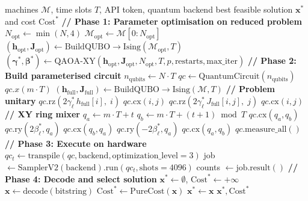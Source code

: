 \begin{algorithm}[htbp]
\small
\caption{QAOA Hardware Execution Pipeline}
\label{alg:qaoa_hardware}
\begin{algorithmic}[1]
\Require machines $\mathcal{M}$, time slots $T$, API token, quantum backend
\Ensure best feasible solution $\mathbf{x}^*$ and cost $\text{Cost}^*$
\Statex \textbf{// Phase 1: Parameter optimisation on reduced problem}
\State $N_{\text{opt}} \gets \min(N, 4)$
\State $\mathcal{M}_{\text{opt}} \gets \mathcal{M}[0 : N_{\text{opt}}]$
\State $(\mathbf{h}_{\text{opt}}, \mathbf{J}_{\text{opt}}) \gets \text{BuildQUBO} \rightarrow \text{Ising}(\mathcal{M}_{\text{opt}}, T)$
\State $(\boldsymbol{\gamma}^*, \boldsymbol{\beta}^*) \gets \text{QAOA-XY}(\mathbf{h}_{\text{opt}}, \mathbf{J}_{\text{opt}}, N_{\text{opt}}, T, p, \text{restarts}, \text{max\_iter})$
\Statex \textbf{// Phase 2: Build parameterised circuit}
\State $n_{\text{qubits}} \gets N \cdot T$
\State $qc \gets \text{QuantumCircuit}(n_{\text{qubits}})$
    \State $qc.x(m \cdot T)$
\EndFor
\State $(\mathbf{h}_{\text{full}}, \mathbf{J}_{\text{full}}) \gets \text{BuildQUBO} \rightarrow \text{Ising}(\mathcal{M}, T)$
    \Statex \textbf{// Problem unitary}
        \State $qc.\text{rz}(2 \gamma^*_\ell \, h_{\text{full}}[i],\; i)$
    \EndFor
        \State $qc.\text{cx}(i, j)$
        \State $qc.\text{rz}(2 \gamma^*_\ell \, J_{\text{full}}[i,j],\; j)$
        \State $qc.\text{cx}(i, j)$
    \EndFor
    \Statex \textbf{// XY ring mixer}
            \State $q_a \gets m \cdot T + t$
            \State $q_b \gets m \cdot T + (t+1) \bmod T$
            \State $qc.\text{cx}(q_a, q_b)$
            \State $qc.\text{ry}(2 \beta^*_\ell, q_a)$
            \State $qc.\text{cx}(q_b, q_a)$
            \State $qc.\text{ry}(-2 \beta^*_\ell, q_a)$
            \State $qc.\text{cx}(q_a, q_b)$
        \EndFor
    \EndFor
\EndFor
\State $qc.\text{measure\_all}()$
\Statex \textbf{// Phase 3: Execute on hardware}
\State $qc_t \gets \text{transpile}(qc, \text{backend}, \text{optimization\_level}=3)$
\State job $\gets \text{SamplerV2}(\text{backend}).\text{run}(qc_t, \text{shots}=4096)$
\State counts $\gets \text{job.result}()$
\Statex \textbf{// Phase 4: Decode and select solution}
\State $\mathbf{x}^* \gets \emptyset$, \quad $\text{Cost}^* \gets +\infty$
    \State $\mathbf{x} \gets \text{decode}(\text{bitstring})$
            \State $\text{Cost}^* \gets \text{PureCost}(\mathbf{x})$
            \State $\mathbf{x}^* \gets \mathbf{x}$
        \EndIf
    \EndIf
\EndFor
\State \Return $\mathbf{x}^*, \text{Cost}^*$
\end{algorithmic}
\end{algorithm}

